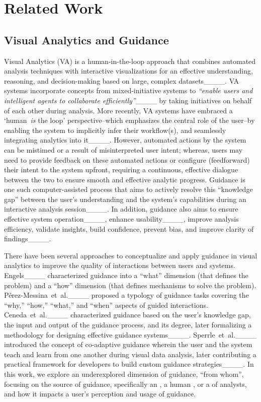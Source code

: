 \section{Related Work}
\label{section:relatedwork}

\subsection{Visual Analytics and Guidance}
Visual Analytics (VA) is a human-in-the-loop approach that combines automated analysis techniques with interactive visualizations for an effective understanding, reasoning, and decision-making based on large, complex datasets____.
VA systems incorporate concepts from mixed-initiative systems to \emph{``enable users and intelligent agents to collaborate efficiently''}____ by taking initiatives on behalf of each other during analysis. More recently, VA systems have embraced a `human~\emph{is} the loop' perspective--which emphasizes the central role of the user--by enabling the system to implicitly infer their workflow(s), and seamlessly integrating analytics into it____.
However, automated actions by the system can be mistimed or a result of misinterpreted user intent; whereas, users may need to provide feedback on these automated actions or configure (feedforward) their intent to the system upfront, requiring a continuous, effective dialogue between the two to ensure smooth and effective analytic progress.
Guidance is one such computer-assisted process that aims to actively resolve this ``knowledge gap'' between the user's understanding and the system's capabilities during an interactive analysis session____.
In addition, guidance also aims to ensure effective system operation____, enhance usability____, improve analysis efficiency, validate insights, build confidence, prevent bias, and improve clarity of findings____.

There have been several approaches to conceptualize and apply guidance in visual analytics to improve the quality of interactions between users and systems.
Engels____ characterized guidance into a ``what'' dimension (that defines the problem) and a ``how'' dimension (that defines mechanisms to solve the problem). 
Pérez-Messina~et~al.____ proposed a typology of guidance tasks covering the ``why,'' ``how,'' ``what,'' and ``when'' aspects of guided interactions.
Ceneda~et~al.____ characterized guidance based on the user's knowledge gap, the input and output of the guidance process, and its degree, later formalizing a methodology for designing effective guidance systems____. 
Sperrle~et~al.____ introduced the concept of co-adaptive guidance wherein the user and the system teach and learn from one another during visual data analysis, later contributing a practical framework for developers to build custom guidance strategies____.
In this work, we explore an underexplored dimension of guidance, ``from whom'', focusing on the source of guidance, specifically an \ai{}, a human \expert{}, or a \group{} of analysts, and how it impacts a user's perception and usage of guidance.



